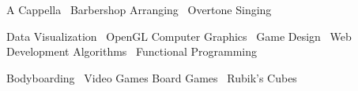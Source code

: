 \documentclass{zres}
\begin{document}
\begin{sidebar}

\begin{infolist}
A Cappella \textbullet\ 
Barbershop %
\mbox{Arranging} \textbullet\ 
Overtone Singing\fulljustify
\end{infolist}


\begin{infolist}
Data Visualization \textbullet\ 
OpenGL %
Computer Graphics \textbullet\ 
Game Design \textbullet\ 
Web Development %
Algorithms \textbullet\ 
Functional Programming
\end{infolist}

\infosubsection{Fun}

\begin{infolist}
Bodyboarding \textbullet\ 
Video Games %
Board Games \textbullet\ 
Rubik's Cubes
\end{infolist}

\end{sidebar}
\end{document}
